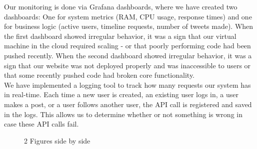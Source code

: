 Our monitoring is done via Grafana dashboards, where we have created two dashboards: One for system metrics (RAM, CPU usage, response times) and one for business logic (active users, timeline requests, number of tweets made). When the first dashboard showed irregular behavior, it was a sign that our virtual machine in the cloud required scaling - or that poorly performing code had been pushed recently. When the second dashboard showed irregular behavior, it was a sign that our website was not deployed properly and was inaccessible to users or that some recently pushed code had broken core functionality. \\

We have implemented a logging tool to track how many requests our system has in real-time. Each time a new user is created, an existing user logs in, a user makes a post, or a user follows another user, the API call is registered and saved in the logs. This allows us to determine whether or not something is wrong in case these API calls fail. 

\begin{figure}[H]
    \centering
    \qquad
    \caption{2 Figures side by side}%
    \label{fig:example}%
\end{figure}

